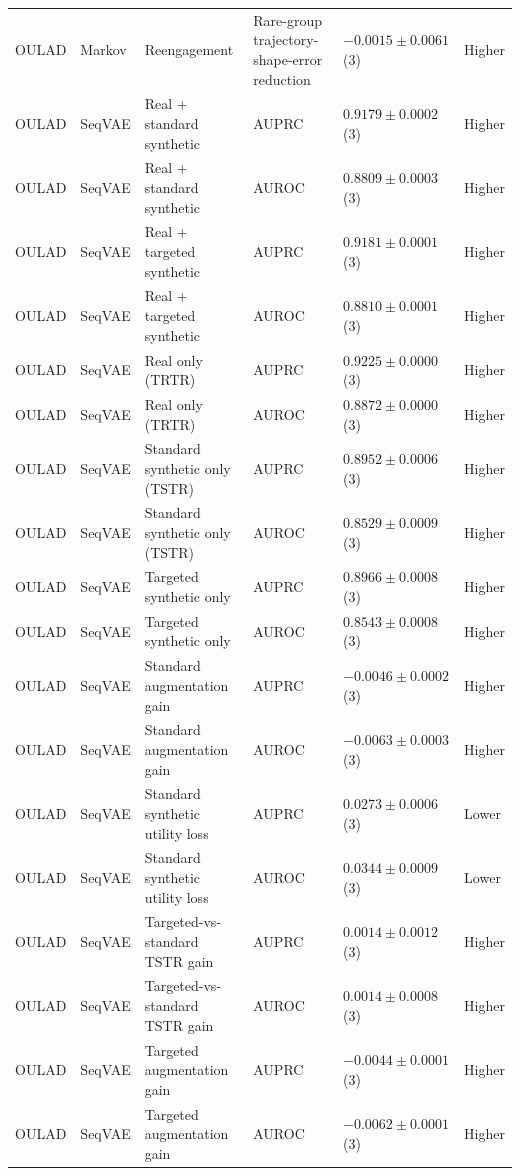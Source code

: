 \begin{longtable}{@{}p{2.25cm}p{2.05cm}p{4.7cm}p{5.0cm}p{2.6cm}p{1.25cm}@{}}
OULAD & Markov & Reengagement & Rare-group trajectory-shape-error reduction & $-0.0015 \mathbin{\pm} 0.0061$ (3) & Higher \\
OULAD & SeqVAE & Real + standard synthetic & AUPRC & $0.9179 \mathbin{\pm} 0.0002$ (3) & Higher \\
OULAD & SeqVAE & Real + standard synthetic & AUROC & $0.8809 \mathbin{\pm} 0.0003$ (3) & Higher \\
OULAD & SeqVAE & Real + targeted synthetic & AUPRC & $0.9181 \mathbin{\pm} 0.0001$ (3) & Higher \\
OULAD & SeqVAE & Real + targeted synthetic & AUROC & $0.8810 \mathbin{\pm} 0.0001$ (3) & Higher \\
OULAD & SeqVAE & Real only (TRTR) & AUPRC & $0.9225 \mathbin{\pm} 0.0000$ (3) & Higher \\
OULAD & SeqVAE & Real only (TRTR) & AUROC & $0.8872 \mathbin{\pm} 0.0000$ (3) & Higher \\
OULAD & SeqVAE & Standard synthetic only (TSTR) & AUPRC & $0.8952 \mathbin{\pm} 0.0006$ (3) & Higher \\
OULAD & SeqVAE & Standard synthetic only (TSTR) & AUROC & $0.8529 \mathbin{\pm} 0.0009$ (3) & Higher \\
OULAD & SeqVAE & Targeted synthetic only & AUPRC & $0.8966 \mathbin{\pm} 0.0008$ (3) & Higher \\
OULAD & SeqVAE & Targeted synthetic only & AUROC & $0.8543 \mathbin{\pm} 0.0008$ (3) & Higher \\
OULAD & SeqVAE & Standard augmentation gain & AUPRC & $-0.0046 \mathbin{\pm} 0.0002$ (3) & Higher \\
OULAD & SeqVAE & Standard augmentation gain & AUROC & $-0.0063 \mathbin{\pm} 0.0003$ (3) & Higher \\
OULAD & SeqVAE & Standard synthetic utility loss & AUPRC & $0.0273 \mathbin{\pm} 0.0006$ (3) & Lower \\
OULAD & SeqVAE & Standard synthetic utility loss & AUROC & $0.0344 \mathbin{\pm} 0.0009$ (3) & Lower \\
OULAD & SeqVAE & Targeted-vs-standard TSTR gain & AUPRC & $0.0014 \mathbin{\pm} 0.0012$ (3) & Higher \\
OULAD & SeqVAE & Targeted-vs-standard TSTR gain & AUROC & $0.0014 \mathbin{\pm} 0.0008$ (3) & Higher \\
OULAD & SeqVAE & Targeted augmentation gain & AUPRC & $-0.0044 \mathbin{\pm} 0.0001$ (3) & Higher \\
OULAD & SeqVAE & Targeted augmentation gain & AUROC & $-0.0062 \mathbin{\pm} 0.0001$ (3) & Higher \\

\end{longtable}
